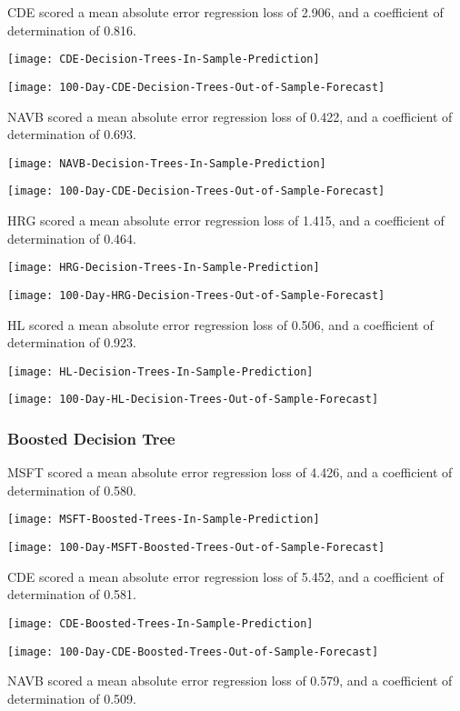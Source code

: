 CDE scored a mean absolute error regression loss of 2.906, and a coefficient of determination of 0.816.

\texttt{[image: CDE-Decision-Trees-In-Sample-Prediction]}

\texttt{[image: 100-Day-CDE-Decision-Trees-Out-of-Sample-Forecast]}

NAVB scored a mean absolute error regression loss of 0.422, and a coefficient of determination of 0.693.

\texttt{[image: NAVB-Decision-Trees-In-Sample-Prediction]}

\texttt{[image: 100-Day-CDE-Decision-Trees-Out-of-Sample-Forecast]}

HRG scored a mean absolute error regression loss of 1.415, and a coefficient of determination of 0.464.

\texttt{[image: HRG-Decision-Trees-In-Sample-Prediction]}

\texttt{[image: 100-Day-HRG-Decision-Trees-Out-of-Sample-Forecast]}

HL scored a mean absolute error regression loss of 0.506, and a coefficient of determination of 0.923.

\texttt{[image: HL-Decision-Trees-In-Sample-Prediction]}

\texttt{[image: 100-Day-HL-Decision-Trees-Out-of-Sample-Forecast]}

\subsubsection{Boosted Decision Tree}
MSFT scored a mean absolute error regression loss of 4.426, and a coefficient of determination of 0.580.

\texttt{[image: MSFT-Boosted-Trees-In-Sample-Prediction]}

\texttt{[image: 100-Day-MSFT-Boosted-Trees-Out-of-Sample-Forecast]}

CDE scored a mean absolute error regression loss of 5.452, and a coefficient of determination of 0.581.

\texttt{[image: CDE-Boosted-Trees-In-Sample-Prediction]}

\texttt{[image: 100-Day-CDE-Boosted-Trees-Out-of-Sample-Forecast]}

NAVB scored a mean absolute error regression loss of 0.579, and a coefficient of determination of 0.509.

